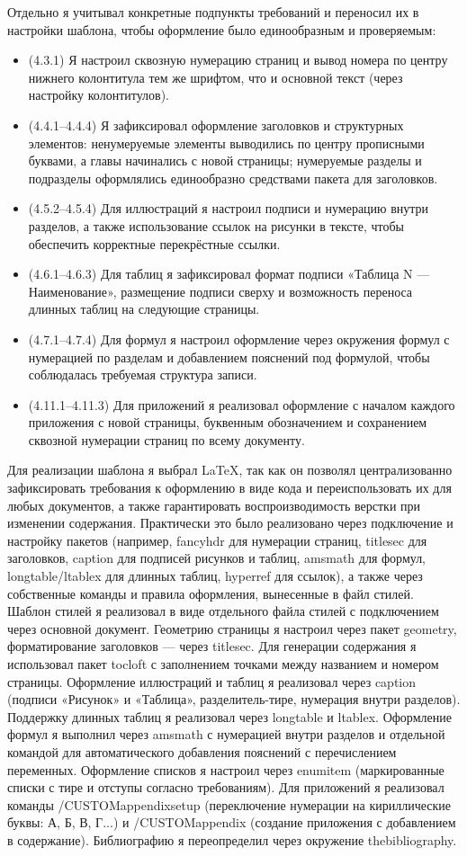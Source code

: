 Отдельно я учитывал конкретные подпункты требований и переносил их в настройки шаблона, чтобы оформление было единообразным и проверяемым:
\begin{itemize}
  \item (4.3.1) Я настроил сквозную нумерацию страниц и вывод номера по центру нижнего колонтитула тем же шрифтом, что и основной текст (через настройку колонтитулов).
  \item (4.4.1--4.4.4) Я зафиксировал оформление заголовков и структурных элементов: ненумеруемые элементы выводились по центру прописными буквами, а главы начинались с новой страницы; нумеруемые разделы и подразделы оформлялись единообразно средствами пакета для заголовков.
  \item (4.5.2--4.5.4) Для иллюстраций я настроил подписи и нумерацию внутри разделов, а также использование ссылок на рисунки в тексте, чтобы обеспечить корректные перекрёстные ссылки.
  \item (4.6.1--4.6.3) Для таблиц я зафиксировал формат подписи «Таблица N — Наименование», размещение подписи сверху и возможность переноса длинных таблиц на следующие страницы.
  \item (4.7.1--4.7.4) Для формул я настроил оформление через окружения формул с нумерацией по разделам и добавлением пояснений под формулой, чтобы соблюдалась требуемая структура записи.
  \item (4.11.1--4.11.3) Для приложений я реализовал оформление с началом каждого приложения с новой страницы, буквенным обозначением и сохранением сквозной нумерации страниц по всему документу.
\end{itemize}

Для реализации шаблона я выбрал LaTeX, так как он позволял централизованно зафиксировать требования к оформлению в виде кода и переиспользовать их для любых документов, 
а также гарантировать воспроизводимость верстки при изменении содержания.
Практически это было реализовано через подключение и настройку пакетов (например, fancyhdr для нумерации страниц, titlesec для заголовков, caption для подписей рисунков и таблиц, amsmath для формул, longtable/ltablex для длинных таблиц, hyperref для ссылок), а также через собственные команды и правила оформления, вынесенные в файл стилей.
Шаблон стилей я реализовал в виде отдельного файла стилей с подключением через основной документ.
Геометрию страницы я настроил через пакет geometry, форматирование заголовков --- через titlesec.
Для генерации содержания я использовал пакет tocloft с заполнением точками между названием и номером страницы.
Оформление иллюстраций и таблиц я реализовал через caption (подписи «Рисунок» и «Таблица», разделитель-тире, нумерация внутри разделов).
Поддержку длинных таблиц я реализовал через longtable и ltablex.
Оформление формул я выполнил через amsmath с нумерацией внутри разделов и отдельной командой для автоматического добавления пояснений с перечислением переменных.
Оформление списков я настроил через enumitem (маркированные списки с тире и отступы согласно требованиям).
Для приложений я реализовал команды \slash CUSTOMappendixsetup (переключение нумерации на кириллические буквы: А, Б, В, Г...) и \slash CUSTOMappendix (создание приложения с добавлением в содержание).
Библиографию я переопределил через окружение thebibliography.

